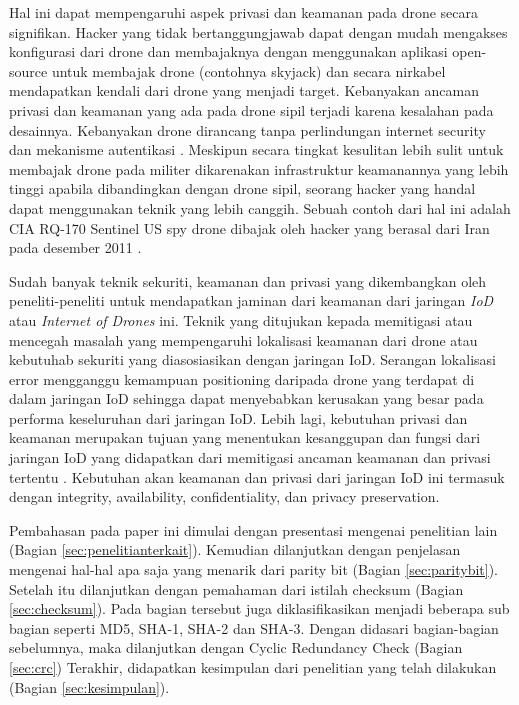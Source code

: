 Hal ini dapat mempengaruhi aspek privasi dan keamanan pada drone secara signifikan. Hacker yang tidak bertanggungjawab dapat dengan mudah mengakses konfigurasi dari drone dan membajaknya dengan menggunakan aplikasi open-source untuk membajak drone (contohnya skyjack) dan secara nirkabel mendapatkan kendali dari drone yang menjadi target. Kebanyakan ancaman privasi dan keamanan yang ada pada drone sipil terjadi karena kesalahan pada desainnya. Kebanyakan drone dirancang tanpa perlindungan internet security dan mekanisme autentikasi \citep{rahman2017smart}. Meskipun secara tingkat kesulitan lebih sulit untuk membajak drone pada militer dikarenakan infrastruktur keamanannya yang lebih tinggi apabila dibandingkan dengan drone sipil, seorang hacker yang handal dapat menggunakan teknik yang lebih canggih. Sebuah contoh dari hal ini adalah CIA RQ-170 Sentinel US spy drone dibajak oleh hacker yang berasal dari Iran pada desember 2011 \citep{mohan2016cybersecurity}.

Sudah banyak teknik sekuriti, keamanan dan privasi yang dikembangkan oleh peneliti-peneliti untuk mendapatkan jaminan dari keamanan dari jaringan \emph{IoD} atau \emph{Internet of Drones} ini. Teknik yang ditujukan kepada memitigasi atau mencegah masalah yang mempengaruhi lokalisasi keamanan dari drone atau kebutuhab sekuriti yang diasosiasikan dengan jaringan IoD. Serangan lokalisasi error mengganggu kemampuan positioning daripada drone yang terdapat di dalam jaringan IoD sehingga dapat menyebabkan kerusakan yang besar pada performa keseluruhan dari jaringan IoD. Lebih lagi, kebutuhan privasi dan keamanan merupakan tujuan yang menentukan kesanggupan dan fungsi dari jaringan IoD yang didapatkan dari memitigasi ancaman keamanan dan privasi tertentu \citep{yahuza2020systematic}. Kebutuhan akan keamanan dan privasi dari jaringan IoD ini termasuk dengan integrity, availability, confidentiality, dan privacy preservation.

Pembahasan pada paper ini dimulai dengan presentasi mengenai penelitian lain (Bagian \ref{sec:penelitianterkait}).
Kemudian dilanjutkan dengan penjelasan mengenai hal-hal apa saja yang menarik dari parity bit (Bagian \ref{sec:paritybit}).
Setelah itu dilanjutkan dengan pemahaman dari istilah checksum (Bagian \ref{sec:checksum}). Pada bagian tersebut juga diklasifikasikan menjadi beberapa sub bagian seperti MD5, SHA-1, SHA-2 dan SHA-3.
Dengan didasari bagian-bagian sebelumnya, maka dilanjutkan dengan Cyclic Redundancy Check  (Bagian \ref{sec:crc})
Terakhir, didapatkan kesimpulan dari penelitian yang telah dilakukan (Bagian \ref{sec:kesimpulan}).
